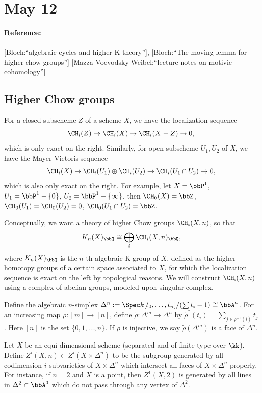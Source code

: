 \section{May 12}


\paragraph{Reference:} [Bloch:``algebraic cycles and higher K-theory''], [Bloch:``The moving lemma for higher chow groups''] [Mazza-Voevodsky-Weibel:``lecture notes on motivic cohomology'']


\subsection{Higher Chow groups}

  For a closed subscheme $Z$ of a scheme $X$, we have the localization sequence
  \[ \CH_i(Z) \to \CH_i(X) \to \CH_i(X-Z) \to 0, \]
  which is only exact on the right. 
  Similarly, for open subscheme $U_1,U_2$ of $X$, we have the Mayer-Vietoris sequence
  \[ \CH_i(X) \to \CH_i(U_1) \oplus \CH_i(U_2) \to \CH_i(U_1\cap  U_2) \to 0, \]
  which is also only exact on the right.
  For example, let $X = \bbP^1$, $U_1 = \bbP^1 - \{0\}$, $U_2 = \bbP^1 - \{\infty\}$, then $\CH_0(X) = \bbZ$, $\CH_0(U_1) = \CH_0(U_2) = 0$, $\CH_0(U_1\cap U_2) = \bbZ$.
  
  Conceptually, we want a theory of higher Chow groups $\CH_i(X,n)$, so that 
  \[ K_n(X)_\bbQ \cong \bigoplus_i \CH_i(X,n)_\bbQ, \]
  where $K_n(X)_\bbQ$ is the $n$-th algebraic K-group of $X$, defined as the higher homotopy groups of a certain space associated to $X$, for which the localization sequence is exact on the left by topological reasons.
  We will construct $\CH_i(X,n)$ using a complex of abelian groups, modeled upon singular complex.

  Define the algebraic $n$-simplex $\Delta^n := \Spec k[t_0,\dots,t_n]/(\sum t_i - 1) \cong \bbA^n$.
  For an increasing map $\rho: [m] \to [n]$, define $\tilde{\rho}: \Delta^m \to \Delta^n$ by $\tilde{\rho}^*(t_i) = \sum_{j\in \rho^{-1}(i)} t_j$.
  Here $[n]$ is the set $\{0,1,\dots,n\}$.
  If $\rho$ is injective, we say $\tilde{\rho}(\Delta^m)$ is a face of $\Delta^n$.
  
  Let $X$ be an equi-dimensional scheme (separated and of finite type over $\kk$).
  Define $Z^i(X,n) \subset Z^i(X\times \Delta^n)$ to be the subgroup generated by all codimension $i$ subvarieties of $X\times \Delta^n$ which intersect all faces of $X\times \Delta^n$ properly.
  For instance, if $n=2$ and $X$ is a point, then $Z^1(X,2)$ is generated by all lines in $\Delta^2 \subset \bbA^3$ which do not pass through any vertex of $\Delta^2$.\Yang{}

